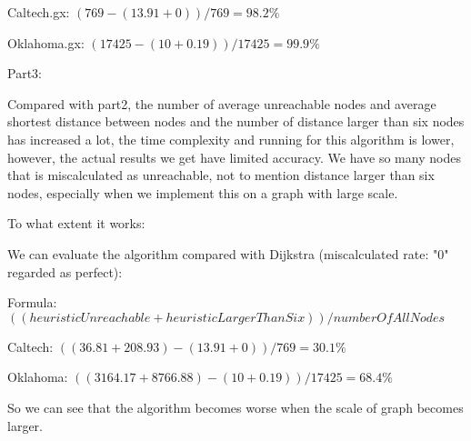 \documentclass{article}
\begin{document}
Caltech.gx: $(769-(13.91+0)) / 769 = 98.2\%$

Oklahoma.gx: $(17425-(10+0.19)) / 17425 = 99.9\%$

Part3:

Compared with part2, the number of average unreachable nodes and average shortest distance between nodes and 
the number of distance larger than six nodes has increased a lot,
the time complexity and running for this algorithm is lower, however, 
the actual results we get have limited accuracy. We have so many nodes that is miscalculated as unreachable, 
not to mention distance larger than six nodes, especially when we implement this on a graph with large scale.

To what extent it works: 

We can evaluate the algorithm compared with Dijkstra (miscalculated rate: "0" regarded as perfect):

Formula: $((heuristicUnreachable+heuristicLargerThanSix)) / numberOfAllNodes$

Caltech: $((36.81+208.93)-(13.91+0)) / 769 = 30.1\%$

Oklahoma: $((3164.17+8766.88)-(10+0.19)) / 17425 = 68.4\%$

So we can see that the algorithm becomes worse when the scale of graph becomes larger.
\end{document}
